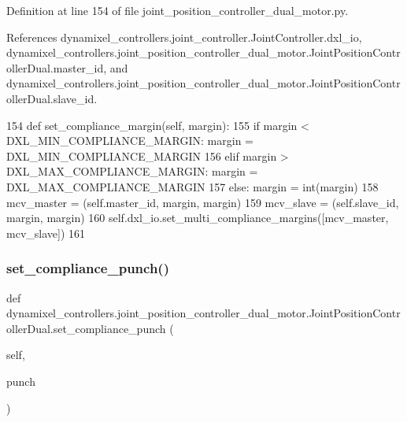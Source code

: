 Definition at line 154 of file joint\+\_\+position\+\_\+controller\+\_\+dual\+\_\+motor.\+py.



References dynamixel\+\_\+controllers.\+joint\+\_\+controller.\+Joint\+Controller.\+dxl\+\_\+io, dynamixel\+\_\+controllers.\+joint\+\_\+position\+\_\+controller\+\_\+dual\+\_\+motor.\+Joint\+Position\+Controller\+Dual.\+master\+\_\+id, and dynamixel\+\_\+controllers.\+joint\+\_\+position\+\_\+controller\+\_\+dual\+\_\+motor.\+Joint\+Position\+Controller\+Dual.\+slave\+\_\+id.


\begin{DoxyCode}
154     \textcolor{keyword}{def }set\_compliance\_margin(self, margin):
155         \textcolor{keywordflow}{if} margin < DXL\_MIN\_COMPLIANCE\_MARGIN: margin = DXL\_MIN\_COMPLIANCE\_MARGIN
156         \textcolor{keywordflow}{elif} margin > DXL\_MAX\_COMPLIANCE\_MARGIN: margin = DXL\_MAX\_COMPLIANCE\_MARGIN
157         \textcolor{keywordflow}{else}: margin = int(margin)
158         mcv\_master = (self.master\_id, margin, margin)
159         mcv\_slave = (self.slave\_id, margin, margin)
160         self.dxl\_io.set\_multi\_compliance\_margins([mcv\_master, mcv\_slave])
161 
\end{DoxyCode}
\mbox{\label{classdynamixel__controllers_1_1joint__position__controller__dual__motor_1_1_joint_position_controller_dual_aa392ad24d93ec0bd5c45bd8248c4823c}} 
\subsubsection{\texorpdfstring{set\+\_\+compliance\+\_\+punch()}{set\_compliance\_punch()}}
{\footnotesize\ttfamily def dynamixel\+\_\+controllers.\+joint\+\_\+position\+\_\+controller\+\_\+dual\+\_\+motor.\+Joint\+Position\+Controller\+Dual.\+set\+\_\+compliance\+\_\+punch (\begin{DoxyParamCaption}\item[{}]{self,  }\item[{}]{punch }\end{DoxyParamCaption})}




